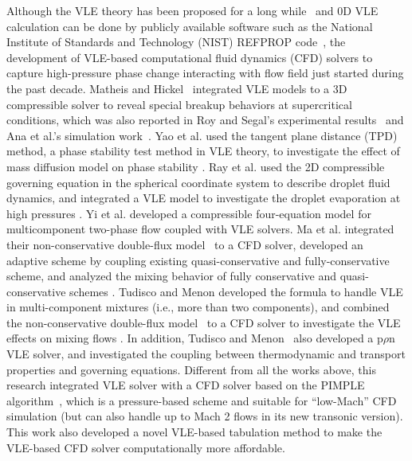 Although the VLE theory has been proposed for a long while~\cite{hanks1971calculation} and 0D VLE calculation can be done by publicly available software such as the National Institute of Standards and Technology (NIST) REFPROP code~\cite{lemmon2018nist}, the development of VLE-based computational fluid dynamics (CFD) solvers to capture high-pressure phase change interacting with flow field just started during the past decade. Matheis and Hickel~\cite{matheis2018multi} integrated VLE models to a 3D compressible solver to reveal special breakup behaviors at supercritical conditions, which was also reported in Roy and Segal's experimental results~\citep{roy2010experimental} and Ana et al.'s simulation work~\citep{star2006numerical}. %
Yao et al. used the tangent plane distance (TPD) method, a phase stability test method in VLE theory, to investigate the effect of mass diffusion model on phase stability \citep{yao2019molecular}. Ray et al. used the 2D compressible governing equation in the spherical coordinate system to describe droplet fluid dynamics, and integrated a VLE model to investigate the droplet evaporation at high pressures \cite{ray2019two}. Yi et al. developed a compressible four-equation model for multicomponent two-phase flow coupled with VLE solvers. Ma et al. integrated their non-conservative double-flux model~\cite{ma2017entropy} to a CFD solver, developed an adaptive scheme by coupling existing quasi-conservative and fully-conservative scheme, and analyzed the mixing behavior of fully conservative and quasi-conservative schemes \citep{ma2019numerical}. Tudisco and Menon developed the formula to handle VLE in multi-component mixtures (i.e., more than two components), and combined the non-conservative double-flux model~\cite{ma2017entropy} to a CFD solver to investigate the VLE effects on mixing flows \cite{tudisco2020numerical}. In addition, Tudisco and Menon~\cite{tudisco2020vapor} also developed a p$\rho$n VLE solver, and investigated the coupling between thermodynamic and transport properties and governing equations. Different from all the works above, this research integrated VLE solver with a CFD solver based on the PIMPLE algorithm~\cite{holzmann2016mathematics}, which is a pressure-based scheme and suitable for ``low-Mach'' CFD simulation (but can also handle up to Mach 2 flows in its new transonic version). This work also developed a novel VLE-based tabulation method to make the VLE-based CFD solver computationally more affordable. 

